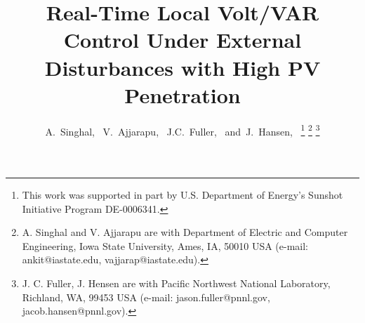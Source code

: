 \documentclass[journal]{IEEEtran}
\begin{document}
%
\title{Real-Time Local Volt/VAR Control Under External Disturbances with High PV Penetration}
%
%
%

\author{A.~Singhal,~
        V.~Ajjarapu,~
         J.C.~Fuller,~
        and~J.~Hansen,~%
\thanks{This work was supported in part by U.S. Department of Energy’s Sunshot Initiative Program DE-0006341.}        
\thanks{A. Singhal and V. Ajjarapu are with Department of Electric and Computer Engineering, Iowa State University, Ames, IA, 50010 USA (e-mail: ankit@iastate.edu, vajjarap@iastate.edu).}%
\thanks{J. C. Fuller, J. Hensen are with Pacific Northwest National Laboratory, Richland, WA, 99453 USA (e-mail: jason.fuller@pnnl.gov, jacob.hansen@pnnl.gov).}}%

% 
%
\end{document}
